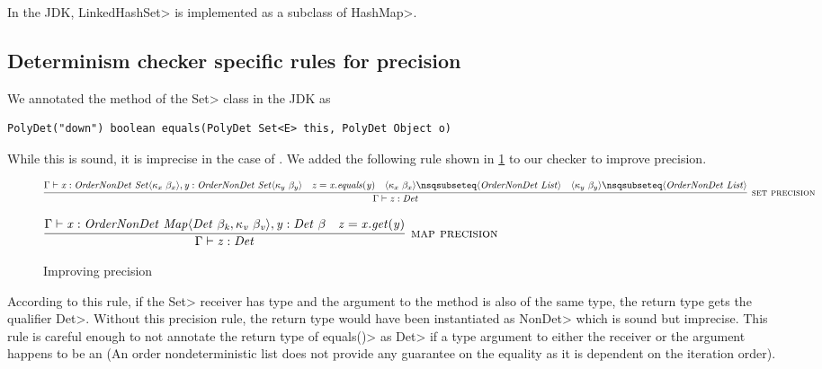 In the JDK, \<LinkedHashSet> is implemented as a subclass of \<HashMap>.

\subsection{Determinism checker specific rules for precision}\label{precision}
We annotated the  method of the \<Set> class in the JDK as
\begin{verbatim}
PolyDet("down") boolean equals(PolyDet Set<E> this, PolyDet Object o)
\end{verbatim}
While this is sound, it is imprecise in the case of . We added the following rule shown in \cref{fig-precision-rules} to our checker to improve precision.
\begin{figure}
    $\infer[\rulename{set precision}]{\Gamma \vdash \|z : Det|}{\Gamma \vdash \|x| : \|OrderNonDet| \ \|Set|\angles{ \kappa_{x} \ \beta_{x}}, \|y| : \|OrderNonDet| \ \|Set|\angles{ \kappa_{y} \ \beta_{y}} & \|z = x.equals(y)| & \angles{ \kappa_{x} \ \beta_{x}} \nsqsubseteq \angles{ \|OrderNonDet \ List| } & \angles{ \kappa_{y} \ \beta_{y}} \nsqsubseteq \angles{ \|OrderNonDet \ List| } }$
    
    \bigskip
    
    $\infer[\rulename{map precision}]{\Gamma \vdash \|z : Det|}{\Gamma \vdash \|x : OrderNonDet \ Map\angles{ Det \ \beta_k, \kappa_v\ \beta_v }, y : Det \ \beta| & \|z = x.get(y)|}$
    
    \caption{Improving precision}
    \label{fig-precision-rules}
\end{figure}
According to this rule, if the \<Set> receiver has type  and the argument to the  method is
also of the same type, the return type gets the qualifier \<Det>. Without this precision rule, the return type would have been instantiated as \<NonDet> which
is sound but imprecise. This rule is careful enough to not annotate the return type of \<equals()> as \<Det> if a type argument to either the
receiver or the argument happens to be an  (An order nondeterministic list does not provide any guarantee on the
equality as it is dependent on the iteration order). 

